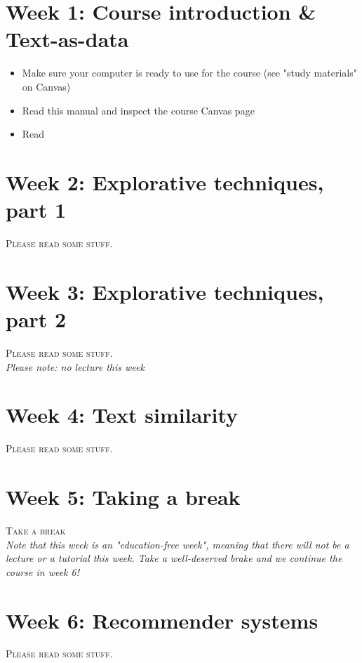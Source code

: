 



\section*{Week 1: Course introduction \& Text-as-data}
\begin{itemize}
	\item{Make sure your computer is ready to use for the course (see "study materials" on Canvas)}
	\item{Read this manual and inspect the course Canvas page}
	\item{Read \cite{boumans_taking_2016}}
\end{itemize}

\section*{Week 2: Explorative techniques, part 1}
\textsc{Please read some stuff.}\\

\section*{Week 3: Explorative techniques, part 2}
\textsc{Please read some stuff.}\\

\emph{Please note: no lecture this week}

\section*{Week 4: Text similarity}
\textsc{Please read some stuff.}\\


\section*{Week 5: Taking a break}
\textsc{Take a break}\\

\emph{Note that this week is an "education-free week", meaning that there will not be a lecture or a tutorial this week. Take a well-deserved brake and we continue the course in week 6!}

\section*{Week 6: Recommender systems}
\textsc{Please read some stuff.}\\


